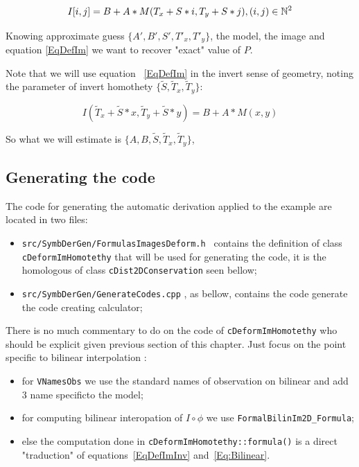 \begin{equation}
	I[i,j] =  B + A * M(T_x + S*i,T_y+S*j) , (i,j) \in \mathbb{N}^2  \label{EqDefIm}
\end{equation}

Knowing approximate guess  $\{A',B',S',T'_x,T'_y\}$, the model, the image and equation
\ref{EqDefIm} we want to recover "exact" value of $P$.

Note that we will use equation ~\ref{EqDefIm} in the invert sense of geometry, noting
the parameter of invert homothety $\{\tilde{S},\tilde{T}_x,\tilde{T}_y\}$:

\begin{equation}
	I(\tilde{T}_x + \tilde{S}*x,\tilde{T}_y + \tilde{S}*y) =  B + A * M(x,y) \label{EqDefImInv}
\end{equation}

So what we will estimate is $\{A,B,\tilde{S},\tilde{T}_x,\tilde{T}_y\}$,


\subsection{Generating the code}

The code for generating the automatic derivation applied to the example are located in two files:

\begin{itemize}
    \item {\tt src/SymbDerGen/FormulasImagesDeform.h } contains the definition of  class 
              {\tt cDeformImHomotethy} that will be used for generating the code, it is the homologous
              of class  {\tt cDist2DConservation} seen bellow;

    \item {\tt src/SymbDerGen/GenerateCodes.cpp} , as bellow, contains the code generate the code
          creating calculator;

\end{itemize}

There is no much commentary to do on the code of {\tt cDeformImHomotethy} who
should be explicit given previous section of this chapter.
Just focus on the point specific to bilinear interpolation :

\begin{itemize}
	\item for {\tt VNamesObs} we use the standard names of observation on bilinear 
              and add $3$ name specificto the model;

      \item for computing bilinear interopation of $I \circ \phi$ we use {\tt FormalBilinIm2D\_Formula};

      \item else the computation done in {\tt cDeformImHomotethy::formula()} is a direct "traduction"
	      of equations~\ref{EqDefImInv} and~\ref{Eq:Bilinear}.

\end{itemize}


